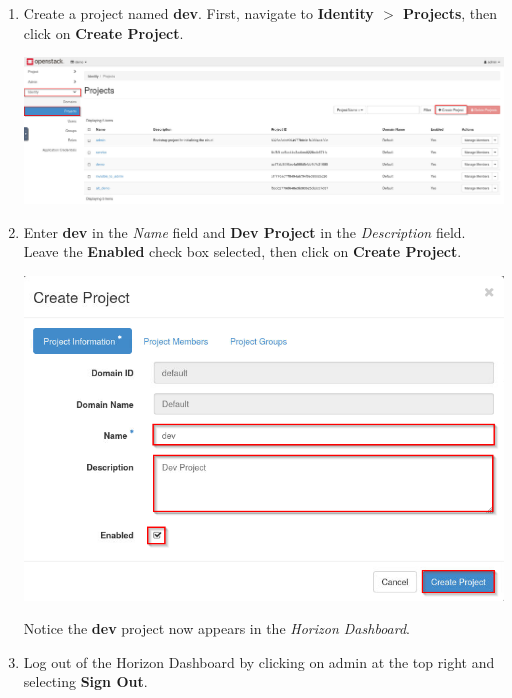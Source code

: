 \documentclass[letterpaper, 12pt]{article}
\begin{document}
\begin{enumerate}
    \item Create a project named \textbf{dev}. First, navigate to \textbf{Identity $>$ Projects}, then click on
    \textbf{Create Project}.

    \begin{center}
        \includegraphics[width=\linewidth]{images/part1/step4.png}
    \end{center}

    \item Enter \textbf{dev} in the \textit{Name} field and \textbf{Dev Project} in the \textit{Description} field.
    Leave the \textbf{Enabled} check box selected, then click on \textbf{Create Project}.

    \begin{center}
        \includegraphics[width=\linewidth]{images/part1/step5.png}
    \end{center}

    \begin{notebox}
        Notice the \textbf{dev} project now appears in the \textit{Horizon Dashboard}.
    \end{notebox}

    \item Log out of the Horizon Dashboard by clicking on admin at the top right and selecting \textbf{Sign Out}.
    

\end{enumerate}
\end{document}
